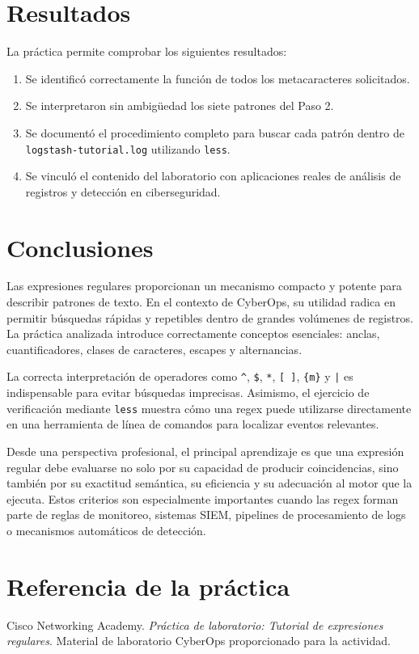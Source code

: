 \documentclass[11pt,a4paper]{article}
\newcommand{\regex}[1]{\texttt{#1}}
\begin{document}
\section{Resultados}

La práctica permite comprobar los siguientes resultados:
\begin{enumerate}
    \item Se identificó correctamente la función de todos los metacaracteres solicitados.
    \item Se interpretaron sin ambigüedad los siete patrones del Paso 2.
    \item Se documentó el procedimiento completo para buscar cada patrón dentro de \texttt{logstash-tutorial.log} utilizando \texttt{less}.
    \item Se vinculó el contenido del laboratorio con aplicaciones reales de análisis de registros y detección en ciberseguridad.
\end{enumerate}

\section{Conclusiones}

Las expresiones regulares proporcionan un mecanismo compacto y potente para describir patrones de texto. En el contexto de CyberOps, su utilidad radica en permitir búsquedas rápidas y repetibles dentro de grandes volúmenes de registros. La práctica analizada introduce correctamente conceptos esenciales: anclas, cuantificadores, clases de caracteres, escapes y alternancias.

La correcta interpretación de operadores como \regex{\string^}, \regex{\$}, \regex{*}, \regex{[ ]}, \regex{\{m\}} y \regex{|} es indispensable para evitar búsquedas imprecisas. Asimismo, el ejercicio de verificación mediante \texttt{less} muestra cómo una regex puede utilizarse directamente en una herramienta de línea de comandos para localizar eventos relevantes.

Desde una perspectiva profesional, el principal aprendizaje es que una expresión regular debe evaluarse no solo por su capacidad de producir coincidencias, sino también por su exactitud semántica, su eficiencia y su adecuación al motor que la ejecuta. Estos criterios son especialmente importantes cuando las regex forman parte de reglas de monitoreo, sistemas SIEM, pipelines de procesamiento de logs o mecanismos automáticos de detección.

\section*{Referencia de la práctica}
Cisco Networking Academy. \emph{Práctica de laboratorio: Tutorial de expresiones regulares}. Material de laboratorio CyberOps proporcionado para la actividad.
\end{document}

